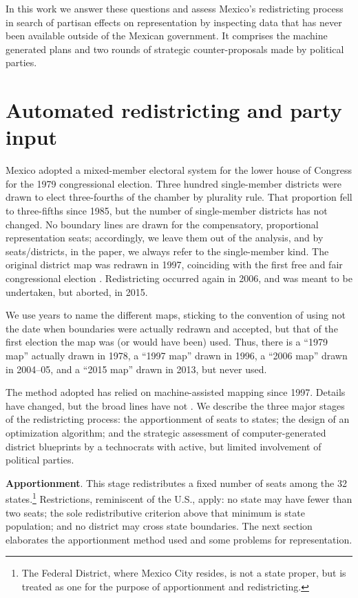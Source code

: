 \documentclass[letter,12pt]{article}
\begin{document}
In this work we answer these questions and assess Mexico's redistricting process in search of partisan effects on representation by inspecting data that has never been available outside of the Mexican government. It comprises the machine generated plans and two rounds of strategic counter-proposals made by political parties. 

\section{Automated redistricting and party input}

Mexico adopted a mixed-member electoral system for the lower house of Congress for the 1979 congressional election. Three hundred single-member districts were drawn to elect three-fourths of the chamber by plurality rule. That proportion fell to three-fifths since 1985, but the number of single-member districts has not changed. No boundary lines are drawn for the compensatory, proportional representation seats; accordingly, we leave them out of the analysis, and by seats/districts, in the paper, we always refer to the single-member kind. The original district map was redrawn in 1997, coinciding with the first free and fair congressional election \citep{lujambio.vives.2008}. Redistricting occurred again in 2006, and was meant to be undertaken, but aborted, in 2015. 

We use years to name the different maps, sticking to the convention of using not the date when boundaries were actually redrawn and accepted, but that of the first election the map was (or would have been) used. Thus, there is a ``1979 map'' actually drawn in 1978, a ``1997 map'' drawn in 1996, a ``2006 map'' drawn in 2004--05, and a ``2015 map'' drawn in 2013, but never used.

The method adopted has relied on machine-assisted mapping since 1997. Details have changed, but the broad lines have not \citep{trelles.mtz.tesisItam.2007}. We describe the three major stages of the redistricting process: the apportionment of seats to states; the design of an optimization algorithm; and the strategic assessment of computer-generated district blueprints by a technocrats with active, but limited involvement of political parties. 

\textbf{Apportionment}. This stage redistributes a fixed number of seats among the 32 states.\footnote{The Federal District, where Mexico City resides, is not a state proper, but is treated as one for the purpose of apportionment and redistricting.} Restrictions, reminiscent of the U.S., apply: no state may have fewer than two seats; the sole redistributive criterion above that minimum is state population; and no district may cross state boundaries. The next section elaborates the apportionment method used and some problems for representation. 
\end{document}
